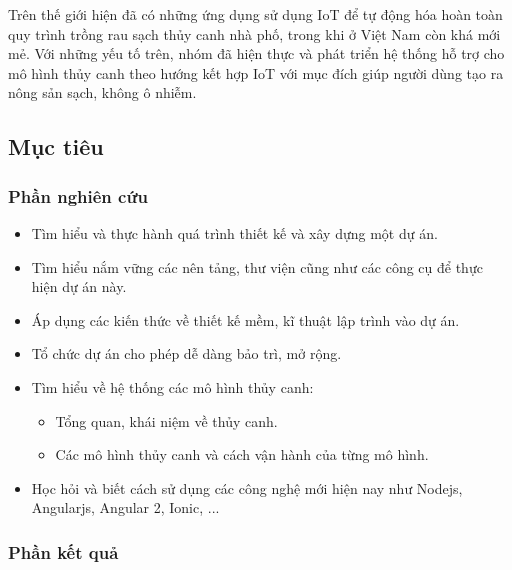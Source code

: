 \documentclass[a4paper,12pt,oneside]{article}
\begin{document}
\noindent Trên thế giới hiện đã có những ứng dụng sử dụng IoT để tự động hóa hoàn toàn quy trình trồng rau sạch thủy canh nhà phố, trong khi ở Việt Nam còn khá mới mẻ. Với những yếu tố trên, nhóm đã hiện thực và phát triển hệ thống hỗ trợ cho mô hình thủy canh theo hướng kết hợp IoT với mục đích giúp người dùng tạo ra nông sản sạch, không ô nhiễm.


\subsection{Mục tiêu}
\subsubsection{Phần nghiên cứu}
\begin{itemize}
\item Tìm hiểu và thực hành quá trình thiết kế và xây dựng một dự án.
\item Tìm hiểu nắm vững các nên tảng, thư viện cũng như các công cụ để thực hiện dự án này.
\item Áp dụng các kiến thức về thiết kế mềm, kĩ thuật lập trình vào dự án.
\item Tổ chức dự án cho phép dễ dàng bảo trì, mở rộng.
\item Tìm hiểu về hệ thống các mô hình thủy canh: 
	\begin{itemize}
	\item Tổng quan, khái niệm về thủy canh.
	\item Các mô hình thủy canh và cách vận hành của từng mô hình.
	\end{itemize}
\item Học hỏi và biết cách sử dụng các công nghệ mới hiện nay như Nodejs, Angularjs, Angular 2, Ionic, ...
\end{itemize}

\subsubsection{Phần kết quả}
\end{document}
